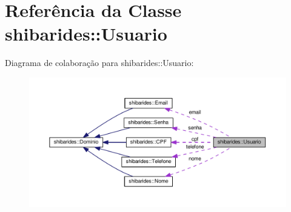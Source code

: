 \hypertarget{classshibarides_1_1Usuario}{}\section{Referência da Classe shibarides\+:\+:Usuario}
\label{classshibarides_1_1Usuario}


Diagrama de colaboração para shibarides\+:\+:Usuario\+:\nopagebreak
\begin{figure}[H]
\begin{center}
\leavevmode
\includegraphics[width=350pt]{classshibarides_1_1Usuario__coll__graph}
\end{center}
\end{figure}
